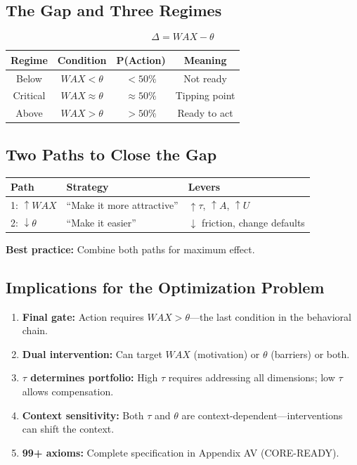 \subsection{The Gap and Three Regimes}

\begin{equation}
\boxed{
\Delta = WAX - \theta
}
\label{eq:mp-gap}
\end{equation}

\begin{center}
\renewcommand{\arraystretch}{1.2}
\begin{tabular}{@{}cccc@{}}
\toprule
\textbf{Regime} & \textbf{Condition} & \textbf{P(Action)} & \textbf{Meaning} \\
\midrule
Below & $WAX < \theta$ & $< 50\%$ & Not ready \\
Critical & $WAX \approx \theta$ & $\approx 50\%$ & Tipping point \\
Above & $WAX > \theta$ & $> 50\%$ & Ready to act \\
\bottomrule
\end{tabular}
\end{center}

\subsection{Two Paths to Close the Gap}

\begin{center}
\renewcommand{\arraystretch}{1.2}
\begin{tabular}{@{}lll@{}}
\toprule
\textbf{Path} & \textbf{Strategy} & \textbf{Levers} \\
\midrule
1: $\uparrow WAX$ & ``Make it more attractive'' & $\uparrow \tau$, $\uparrow A$, $\uparrow U$ \\
2: $\downarrow \theta$ & ``Make it easier'' & $\downarrow$ friction, change defaults \\
\bottomrule
\end{tabular}
\end{center}

\textbf{Best practice:} Combine both paths for maximum effect.

\subsection{Implications for the Optimization Problem}

\begin{enumerate}[nosep]
\item \textbf{Final gate:} Action requires $WAX > \theta$---the last condition in the behavioral chain.
\item \textbf{Dual intervention:} Can target $WAX$ (motivation) or $\theta$ (barriers) or both.
\item \textbf{$\tau$ determines portfolio:} High $\tau$ requires addressing all dimensions; low $\tau$ allows compensation.
\item \textbf{Context sensitivity:} Both $\tau$ and $\theta$ are context-dependent---interventions can shift the context.
\item \textbf{99+ axioms:} Complete specification in Appendix AV (CORE-READY).
\end{enumerate}


